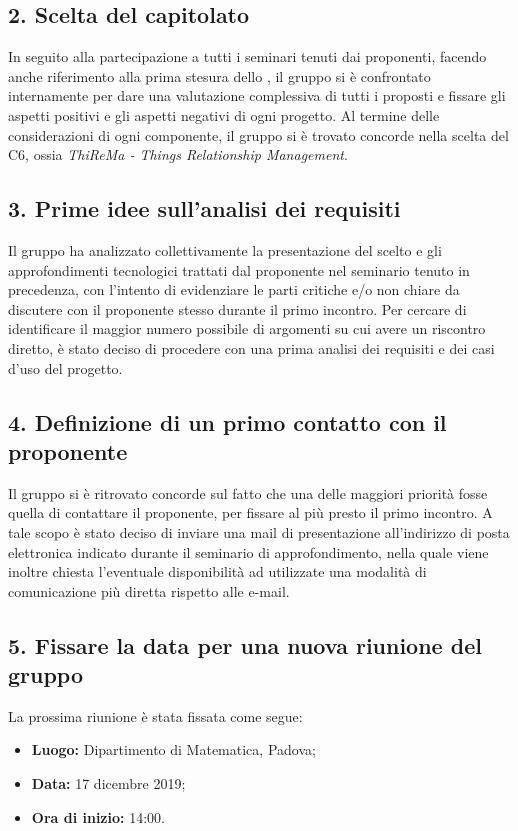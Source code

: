 \subsection*{2. Scelta del capitolato}

In seguito alla partecipazione a tutti i seminari tenuti dai proponenti, facendo anche riferimento alla prima stesura dello , il gruppo si è confrontato internamente per dare una valutazione complessiva di tutti i  proposti e fissare gli aspetti positivi e gli aspetti negativi di ogni progetto.
Al termine delle considerazioni di ogni componente, il gruppo si è trovato concorde nella scelta del  C6, ossia \textit{ThiReMa - Things Relationship Management}.

\subsection*{3. Prime idee sull'analisi dei requisiti}

Il gruppo ha analizzato collettivamente la presentazione del  scelto e gli approfondimenti tecnologici trattati dal proponente nel seminario tenuto in precedenza, con l'intento di evidenziare le parti critiche e/o non chiare da discutere con il proponente stesso durante il primo incontro.
Per cercare di identificare il maggior numero possibile di argomenti su cui avere un riscontro diretto, è stato deciso di procedere con una prima analisi dei requisiti e dei casi d'uso del progetto.

\subsection*{4. Definizione di un primo contatto con il proponente}

Il gruppo si è ritrovato concorde sul fatto che una delle maggiori priorità fosse quella di contattare il proponente, per fissare al più presto il primo incontro.
A tale scopo è stato deciso di inviare una mail di presentazione all'indirizzo di posta elettronica indicato durante il seminario di approfondimento, nella quale viene inoltre chiesta l'eventuale disponibilità ad utilizzate una modalità di comunicazione più diretta rispetto alle e-mail.

\subsection*{5. Fissare la data per una nuova riunione del gruppo}

La prossima riunione è stata fissata come segue:
\begin{itemize}
	\item \textbf{Luogo:} Dipartimento di Matematica, Padova;
	\item \textbf{Data:} 17 dicembre 2019;
	\item \textbf{Ora di inizio:} 14:00.
\end{itemize}


